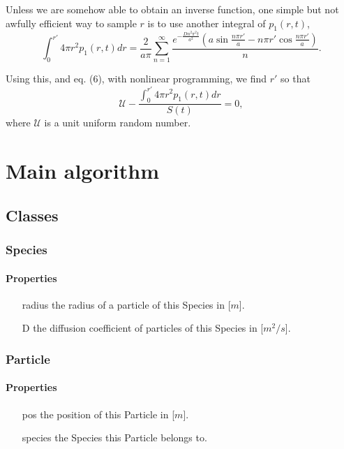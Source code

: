 \documentclass[english]{article}
\begin{document}
Unless we are somehow able to obtain an inverse function, one simple
but not awfully efficient way to sample $r$ is to use another integral
of $p_{1}(r,t)$, \begin{equation}
\int_{0}^{r'}4\pi r^{2}p_{1}(r,t)dr=\frac{2}{a\pi}\sum_{n=1}^{\infty}\frac{e^{-\frac{Dn^{2}\pi^{2}t}{a^{2}}}\left(a\sin\frac{n\pi r'}{a}-n\pi r'\cos\frac{n\pi r'}{a}\right)}{n}.\end{equation}


Using this, and eq. (6), with nonlinear programming, we find $r'$
so that 
\begin{equation}
   \mathcal{U}-\frac{\int_{0}^{r'}4\pi r^{2}p_{1}(r,t)dr}{S(t)}=0,
\end{equation}
 where $\mathcal{U}$ is a unit uniform random number.


\section{Main algorithm}

\subsection{Classes}

\subsubsection{Species}

\paragraph{Properties}

\begin{itemize}
\item[radius] the radius of a particle of this Species in [$m$].
\item[D] the diffusion coefficient of particles of this Species in [$m^2/s$].
\end{itemize}

\subsubsection{Particle}

\paragraph{Properties}

\begin{itemize}
\item[pos] the position of this Particle in [$m$].
\item[species] the Species this Particle belongs to.
\end{itemize}
\end{document}
